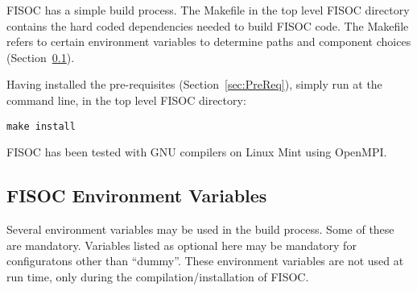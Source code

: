 \documentclass[12pt]{article}
\begin{document}
FISOC has a simple build process.  The Makefile in the top level FISOC directory contains the 
hard coded dependencies needed to build FISOC code.  The Makefile refers to certain 
environment variables to determine paths and component choices (Section~\ref{sec:EnvVars}). 

Having installed the pre-requisites (Section~\ref{sec:PreReq}), simply run at the command line, 
in the top level FISOC directory:
\begin{lstlisting}
make install
\end{lstlisting}

FISOC has been tested with GNU compilers on Linux Mint using OpenMPI. 



\subsection{FISOC Environment Variables}
\label{sec:EnvVars}

Several environment variables may be used in the build process. 
Some of these are mandatory. 
Variables listed as optional here may be mandatory for configuratons other than 
``dummy''.
These environment variables are not used at run time, only during 
the compilation/installation of FISOC.
\end{document}
